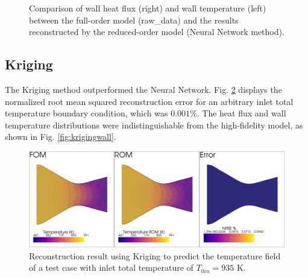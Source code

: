 \documentclass[10pt,fleqn,a4paper,twoside]{article}
\begin{document}
\begin{figure}[!ht]%
    \centering
    \qquad
    \caption{Comparison of wall heat flux (right) and wall temperature (left) between the full-order model (raw\_data) and the results reconstructed by the reduced-order model (Neural Network method).}
    \label{fig:onlinewall}%
\end{figure}

\subsection{Kriging}

The Kriging method outperformed the Neural Network. Fig. \ref{fig:krigingtest} displays the normalized root mean squared reconstruction error for an arbitrary inlet total temperature boundary condition, which was $0.001\%$. The heat flux and wall temperature distributions were indistinguishable from the high-fidelity model, as shown in Fig. \ref{fig:krigingwall}.

\begin{figure}[!ht]
	\begin{center}
		\includegraphics[width=\textwidth]{images/kriging_test_2d.png}
		\caption{Reconstruction result using Kriging to predict the temperature field of a test case with inlet total temperature of $T_{0in}=935$ K.}
    \label{fig:krigingtest}
	\end{center}  
\end{figure}
\end{document}
